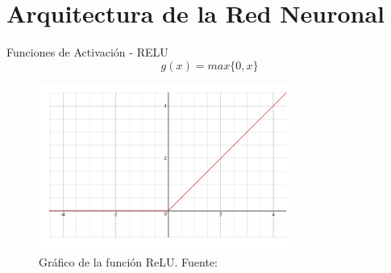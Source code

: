\documentclass[10pt]{beamer}
\begin{document}
\section*{Arquitectura de la Red Neuronal}




\begin{frame}{Funciones de Activación - RELU}
    \begin{equation}\label{eq:relu}
        g(x) = max\{0,x\}
    \end{equation}

    \begin{figure}[!h] 
        \centering
        \includegraphics[width=0.75\textwidth]{../img/relu}
        \caption[Gráfico de la función ReLU]{Gráfico de la función ReLU. Fuente: \cite{wang_2016} }
    \end{figure}
\end{frame}
\end{document}
